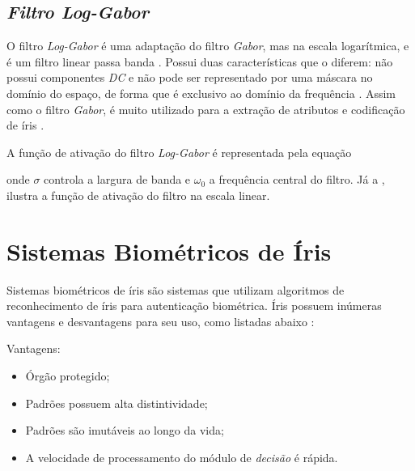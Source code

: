 \subsection{\textit{Filtro Log-Gabor}}\label{sec:fundamentacao:filtragem:loggabor}

\par O filtro \textit{Log-Gabor} é uma adaptação do filtro \textit{Gabor}, mas na escala logarítmica, e é um filtro linear passa banda \cite{field1987-loggabor, masek2003}. Possui duas características que o diferem: não possui componentes \textit{DC} e não pode ser representado por uma máscara no domínio do espaço, de forma que é exclusivo ao domínio da frequência \cite{loggabor-kovesi}. Assim como o filtro \textit{Gabor}, é muito utilizado para a extração de atributos e codificação de íris \cite{masek2003}.

\par A função de ativação do filtro \textit{Log-Gabor} é representada pela equação


\noindent  onde $\sigma$ controla a largura de banda e $\omega_{0}$ a frequência central do filtro. Já a , ilustra a função de ativação do filtro na escala linear.




\section{Sistemas Biométricos de Íris}

\par Sistemas biométricos de íris são sistemas que utilizam algoritmos de reconhecimento de íris para autenticação biométrica. Íris possuem inúmeras vantagens e desvantagens para seu uso, como listadas abaixo \cite{advantagesDaugman}:

\par Vantagens: 

\begin{itemize}
    \item Órgão protegido;
    \item Padrões possuem alta distintividade;
    \item Padrões são imutáveis ao longo da vida;
    \item A velocidade de processamento do módulo de \textit{decisão} é rápida.
\end{itemize}

